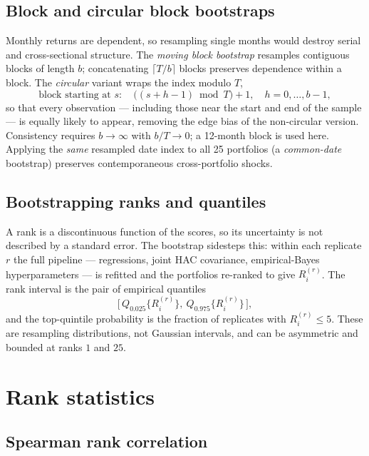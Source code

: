 \subsection{Block and circular block bootstraps}

Monthly returns are dependent, so resampling single months would destroy
serial and cross-sectional structure. The \emph{moving block bootstrap}
resamples contiguous blocks of length $b$; concatenating $\lceil T/b\rceil$
blocks preserves dependence within a block. The \emph{circular} variant
wraps the index modulo $T$,
\begin{equation}
\text{block starting at }s:\quad \bigl((s+h-1)\bmod T\bigr)+1,\quad h=0,\dots,b-1,
\end{equation}
so that every observation --- including those near the start and end of the
sample --- is equally likely to appear, removing the edge bias of the
non-circular version. Consistency requires $b\to\infty$ with $b/T\to 0$; a
12-month block is used here. Applying the \emph{same} resampled date index
to all 25 portfolios (a \emph{common-date} bootstrap) preserves
contemporaneous cross-portfolio shocks.

\subsection{Bootstrapping ranks and quantiles}

A rank is a discontinuous function of the scores, so its uncertainty is
not described by a standard error. The bootstrap sidesteps this: within
each replicate $r$ the full pipeline --- regressions, joint HAC covariance,
empirical-Bayes hyperparameters --- is refitted and the portfolios re-ranked
to give $R_i^{(r)}$. The rank interval is the pair of empirical quantiles
\begin{equation}
\bigl[\,Q_{0.025}\{R_i^{(r)}\},\ Q_{0.975}\{R_i^{(r)}\}\,\bigr],
\end{equation}
and the top-quintile probability is the fraction of replicates with
$R_i^{(r)}\le 5$. These are resampling distributions, not Gaussian
intervals, and can be asymmetric and bounded at ranks $1$ and $25$.

\section{Rank statistics}\label{prelim-rank}

\subsection{Spearman rank correlation}

